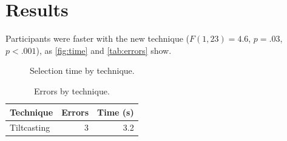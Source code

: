 \documentclass[sigconf]{acmart}
\begin{document}
\section{Results}
Participants were faster with the new technique ($F(1, 23) = 4.6$, $p = .03$, $p < .001$),
as \autoref{fig:time} and \autoref{tab:errors} show.
\begin{figure}
  \caption{Selection time by technique.}
  \label{fig:time}
\end{figure}
\begin{table}
  \caption{Errors by technique.}
  \label{tab:errors}
  \begin{tabular}{@{}lrr@{}}
    \toprule
    Technique & Errors & Time (s) \\
    \midrule
    Tiltcasting & 3 & 3.2 \\
    \bottomrule
  \end{tabular}
\end{table}
\end{document}
